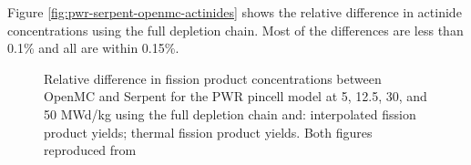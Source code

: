 Figure \ref{fig:pwr-serpent-openmc-actinides} shows the relative difference in
actinide concentrations using the full depletion chain. Most of the differences
are less than 0.1\% and all are within 0.15\%. 

\begin{figure}[htpb]
    \centering
    \caption[Relative difference in fission product concentrations between
    OpenMC and Serpent for the PWR pincell model]{Relative difference in fission
    product concentrations between OpenMC and Serpent for the PWR pincell model
    at 5, 12.5, 30, and 50 MWd/kg using the full depletion chain and:
     interpolated fission product yields;
     thermal fission product yields.
    Both figures reproduced from \cite{romano_depletion_2021}}
    \label{fig:pwr-serpent-openmc-fp}
\end{figure}

